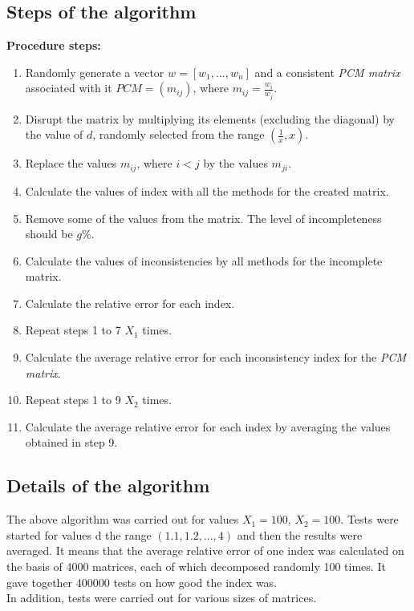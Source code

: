 \subsection{Steps of the algorithm}
\textbf{Procedure steps:}
\begin{enumerate}
\item Randomly generate a vector $w=[w_{1},...,w_{n}]$ and a consistent \textit{PCM matrix} associated with it $PCM=\left(m_{ij}\right)$, where $m_{ij}=\frac{w_{i}}{w_{j}}$.
\item Disrupt the matrix by multiplying its elements (excluding the diagonal) by the value of $d$, randomly selected from the range $\left(\frac{1}{x},x\right)$.
\item Replace the values $m_{ij}$, where $i<j$ by the values $m_{ji}$.

\item Calculate the values of index with all the methods for the created matrix.

\item Remove some of the values from the matrix. The level of incompleteness should be $g$\%.

\item Calculate the values of inconsistencies by all methods for the incomplete matrix.

\item Calculate the relative error for each index.

\item Repeat steps 1 to 7 $X_{1}$ times.

\item Calculate the average relative error for each inconsistency index for the \textit{PCM matrix}.

\item Repeat steps 1 to 9 $X_{2}$ times.

\item Calculate the average relative error for each index by averaging the values obtained in step 9.

\end{enumerate}


\subsection{Details of the algorithm}
The above algorithm was carried out for values $X_{1}=100$, $X_{2}=100$. Tests were started for values d the range $\left(1.1,1.2,...,4\right)$ and then the results were averaged. It means that the average relative error of one index was calculated on the basis of 4000 matrices, each of which decomposed randomly 100 times. It gave together 400000 tests on how good the index was. 
\\
In addition, tests were carried out for various sizes of matrices.

